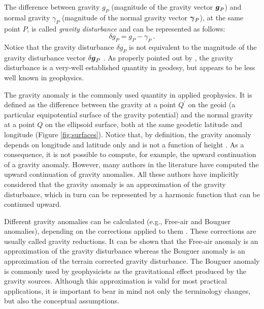 \documentclass[extra]{gji}
\begin{document}
The difference between gravity $g_{P}$ (magnitude of the gravity 
vector $\mitbf{g}_{P}$) and normal gravity $\gamma_{P}$ 
(magnitude of the normal gravity vector $\mitbf{\gamma}_{P}$), at the 
same point $P$, is called \textit{gravity disturbance} 
\citep{heiskanen-moritz1967, hofmann-wellenhof-moritz2005} 
and can be represented as follows:
\begin{equation}
\delta g_{P} = g_{P} - \gamma_{P} \: .
\label{eq:gravity-disturbance}
\end{equation}
Notice that the gravity disturbance $\delta g_{P}$ is not equivalent 
to the magnitude of the gravity disturbance vector 
$\delta \mitbf{g}_{P}$ \citep{barthelmes2013, sanso_sideris2013}.
As properly pointed out by \citet{hackney-featherstone2003},
the gravity disturbance is a very-well established quantity in geodesy,
but appears to be less well known in geophysics.


The gravity anomaly is the commonly used quantity in applied 
geophysics. It is defined as the difference between the 
gravity at a point $Q^{\prime}$ on the geoid (a particular 
equipotential surface of the gravity potential) and the normal gravity 
at a point $Q$ on the ellipsoid surface,
both at the same geodetic latitude and longitude (Figure \ref{fig:surfaces}).
Notice that, by definition, the gravity anomaly depends on 
longitude and latitude only and is not a function of height 
\citep{barthelmes2013}. As a consequence, it is not possible to compute,
for example, the upward continuation of a gravity anomaly.
However, many authors in the literature have computed the upward 
continuation of gravity anomalies. All these authors have implicitly 
considered that the gravity anomaly is an approximation of 
the gravity disturbance, which in turn can be represented by a 
harmonic function that can be continued upward.

Different gravity anomalies can be calculated (e.g., Free-air and 
Bouguer anomalies), depending on the corrections applied to 
them \citep{blakely1996, hofmann-wellenhof-moritz2005}.
These corrections are usually called gravity reductions.
It can be shown that the Free-air anomaly is an approximation of the
gravity disturbance whereas the Bouguer anomaly
is an approximation of the terrain corrected gravity disturbance.
The Bouguer anomaly is commonly used by geophysicists as the
gravitational effect produced by the gravity sources.
Although this approximation is valid for most practical applications,
it is important to bear in mind not only the terminology 
changes, but also the conceptual assumptions.
\end{document}
